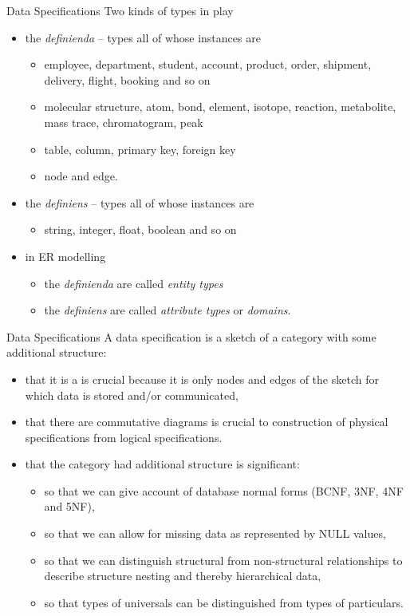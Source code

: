 \begin{frame}{Data Specifications}
Two kinds of types in play
\begin{itemize}
\item  the \textit{definienda} -- types all of whose instances are 
\begin{itemize}
\item employee, department, student, account, product, order, shipment, delivery, flight, booking and so on
\item molecular structure, atom, bond, element, isotope, reaction, metabolite, mass trace, chromatogram, peak
\item table, column, primary key, foreign key
\item node and edge. 
\end{itemize}
\pause 
\item  the \textit{definiens}  -- types all of whose instances are 
\begin{itemize}
       \item string, integer, float, boolean and so on
\end{itemize}
\end{itemize}
\pause
\begin{itemize}
\item in ER modelling 
\begin{itemize}
\item the \textit{definienda} are called \textit{entity types}
\item the \textit{definiens} are called \textit{attribute types} or \textit{domains}.
\end{itemize}
\end{itemize}
\end{frame}


\begin{frame}{Data Specifications}
A data specification is a sketch of a category with some additional structure:
\begin{itemize}
\item that it is a  is crucial because it is only nodes and edges of the sketch for which data is stored and/or communicated, 
\item that there are commutative diagrams is crucial to construction of physical 
specifications from logical specifications.
\item that the category had additional structure is significant:
\begin{itemize}
\item so that we can give account of database normal forms 
(BCNF, 3NF, 4NF and 5NF),
\item so that we can allow for missing data as represented by NULL values, 
\item so that we can distinguish structural from non-structural relationships to describe structure nesting and thereby hierarchical data,
\item so that types of universals can be distinguished from types of particulars.
\end{itemize}
\end{itemize}
\end{frame}



